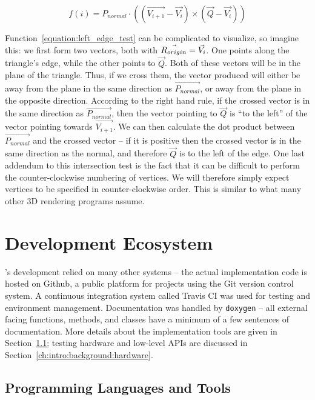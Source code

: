 \begin{equation}
  \label{equation:left_edge_test}
  f(i) = P_{normal} \cdot ((\vec{V_{i+1}} - \vec{V_i}) \times (\vec{Q} - \vec{V_i}))
\end{equation}

Function~\ref{equation:left_edge_test} can be complicated to visualize, so imagine this: we first form two vectors, both with $\vec{R_{origin}} = \vec{V_i}$.
One points along the triangle's edge, while the other points to $\vec{Q}$.
Both of these vectors will be in the plane of the triangle.
Thus, if we cross them, the vector produced will either be away from the plane in the same direction as $\vec{P_{normal}}$, or away from the plane in the opposite direction.
According to the right hand rule, if the crossed vector is in the same direction as $\vec{P_{normal}}$, then the vector pointing to $\vec{Q}$ is ``to the left'' of the vector pointing towards $\vec{V_{i+1}}$.
We can then calculate the dot product between $\vec{P_{normal}}$ and the crossed vector -- if it is positive then the crossed vector is in the same direction as the normal, and therefore $\vec{Q}$ is to the left of the edge.
One last addendum to this intersection test is the fact that it can be difficult to perform the counter-clockwise numbering of vertices.
We will therefore simply expect vertices to be specified in counter-clockwise order.
This is similar to what many other 3D rendering programs assume.


\section{Development Ecosystem}
\label{ch:intro:background:development_ecosystem}

\name's development relied on many other systems -- the actual implementation code is hosted on Github, a public platform for projects using the Git version control system.
A continuous integration system called Travis CI \cite{travisci} was used for testing and environment management.
Documentation was handled by \texttt{doxygen} \cite{van2008doxygen} -- all external facing functions, methods, and classes have a minimum of a few sentences of documentation.
More details about the implementation tools are given in Section~\ref{ch:intro:background:languages_and_libraries}; testing hardware and low-level APIs are discussed in Section~\ref{ch:intro:background:hardware}.

\subsection{Programming Languages and Tools}
\label{ch:intro:background:languages_and_libraries}

